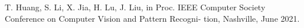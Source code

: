T. Huang, S. Li, X. Jia, H. Lu, J. Liu, in Proc. IEEE Computer
Society Conference on Computer Vision and Pattern Recogni-
tion, Nashville, June 2021.
